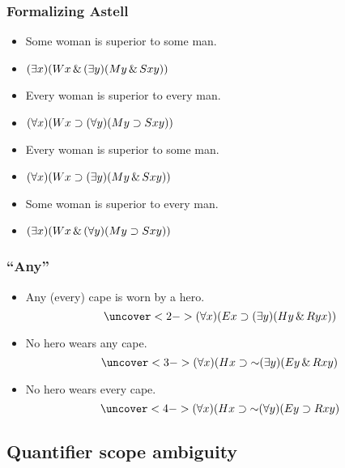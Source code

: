 \begin{frame}
    \frametitle{Formalizing Astell}

\begin{itemize}[<+->]
\item Some woman is superior to some man.
\item[] \alert{$(\exists x)(Wx \,\&\, (\exists y)(My \,\&\, Sxy))$}
\item Every woman is superior to every man.
\item[] \alert{$(\forall x)(Wx \supset (\forall y)(My \supset Sxy))$}
\item Every woman is superior to some man.
\item[]\alert{$(\forall x)(Wx \supset (\exists y)(My \,\&\, Sxy))$}
\item Some woman is superior to every man.
\item[] \alert{$(\exists x)(Wx \,\&\, (\forall y)(My \supset Sxy))$}
\end{itemize}
\end{frame}

\begin{frame}
    \frametitle{``Any''}

\begin{itemize}[<+->]
\item Any (every) cape is worn by a hero.
\[
\uncover<2->{\qt{\forall}{x}(E\qv{x} \eif \qt{\exists}{y}(H\qv{y} \land R\qr{y}{x}))}
\]\pause
\item No hero wears any cape.
\[
\uncover<3->{\qt{\forall}{x}(H\qv{x} \eif \enot\qt{\exists}{y}(E\qv{y} \land R\qr{x}{y})}
\]
\item No hero wears every cape.
\[
\uncover<4->{\qt{\forall}{x}(H\qv{x} \eif \enot\qt{\forall}{y}(E\qv{y} \eif R\qr{x}{y})}
\]
\end{itemize}
\end{frame}



\subsection{Quantifier scope ambiguity}

